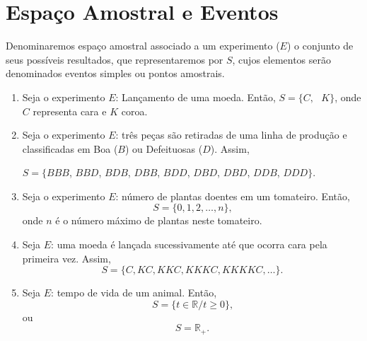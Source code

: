 \documentclass[11pt,fleqn]{book}
\numberwithin{mpicture}{chapter}
\numberwithin{mtable}{chapter}
\numberwithin{mframe}{chapter}
\begin{document}
\section{Espaço Amostral e Eventos}

\begin{definition}
	Denominaremos espaço amostral associado a um experimento ($E$) o conjunto de seus possíveis resultados, que representaremos por $S$, cujos elementos serão denominados eventos simples ou pontos amostrais.
\end{definition}

\begin{pageWidthArea}
	\begin{example}
		\label{example:pecas_boas_defeituosas}
		\begin{multicols}{2}
			\begin{enumerate}\hfill
				\item Seja o experimento $E$: Lançamento de uma moeda. Então, $S=\{C,\text{ }K\}$, onde $C$ representa cara e $K$ coroa.
			
				\item Seja o experimento $E$: três peças são retiradas de uma linha de produção e classificadas em Boa ($B$) ou Defeituosas ($D$). Assim,
					\label{example:item:pecas_boas_defeituosas}
					\begin{center}
						\(S=\{BBB\), \(BBD\), \(BDB\), \(DBB\), \(BDD\), \(DBD\), \(DBD\), \(DDB\), \(DDD\}\).
					\end{center}
		
				\item Seja o experimento $E$: número de plantas doentes em um tomateiro. Então,
					\[
						S=\{0, 1, 2, \dots, n\}\text{,}
					\]
					onde $n$ é o número máximo de plantas neste tomateiro.
					
				\columnbreak
			
				\item Seja $E$: uma moeda é lançada sucessivamente até que ocorra cara pela primeira vez. Assim,
					\[
						S=\{C, KC, KKC, KKKC, KKKKC, \dots \}\text{.}
					\]
			
				\item Seja $E$: tempo de vida de um animal. Então,
					\[
						S=\{t\in\mathbb{R}/ t\geqslant 0\}\text{,}
					\]
					ou
					\[
						S=\mathbb{R}_{+}\text{.}
					\]
			\end{enumerate}
		\end{multicols}
	\end{example}
\end{pageWidthArea}
\end{document}
